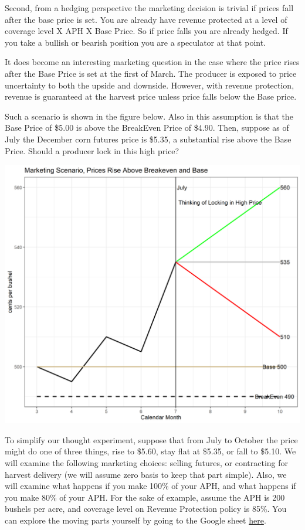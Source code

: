 \documentclass[
]{book}
\begin{document}
Second, from a hedging perspective the marketing decision is trivial if prices fall after the base price is set. You are already have revenue protected at a level of coverage level X APH X Base Price. So if price falls you are already hedged. If you take a bullish or bearish position you are a speculator at that point.

It does become an interesting marketing question in the case where the price rises after the Base Price is set at the first of March. The producer is exposed to price uncertainty to both the upside and downside. However, with revenue protection, revenue is guaranteed at the harvest price unless price falls below the Base price.

Such a scenario is shown in the figure below. Also in this assumption is that the Base Price of \$5.00 is above the BreakEven Price of \$4.90. Then, suppose as of July the December corn futures price is \$5.35, a substantial rise above the Base Price. Should a producer lock in this high price?

\includegraphics{assets/cropins_ex.png}

To simplify our thought experiment, suppose that from July to October the price might do one of three things, rise to \$5.60, stay flat at \$5.35, or fall to \$5.10. We will examine the following marketing choices: selling futures, or contracting for harvest delivery (we will assume zero basis to keep that part simple). Also, we will examine what happens if you make 100\% of your APH, and what happens if you make 80\% of your APH. For the sake of example, assume the APH is 200 bushels per acre, and coverage level on Revenue Protection policy is 85\%. You can explore the moving parts yourself by going to the Google sheet \href{https://docs.google.com/spreadsheets/d/1rbne8odUljxIuIYP3IRiWyzaQDs83-mjOkuaaDWxb3w/edit?usp=sharing}{here}.
\end{document}
